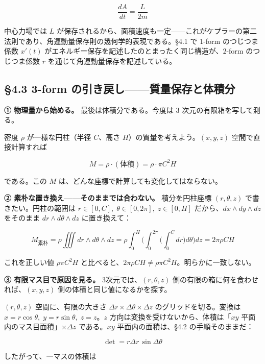 \documentclass[a4paper,12pt,openany]{book}
\begin{document}
\[\frac{dA}{dt} = \frac{L}{2m}\]

中心力場では \(L\)
が保存されるから、面積速度も一定——これがケプラーの第二法則であり、角運動量保存則の幾何学的表現である。§4.1
で \(1\)-form のつじつま係数 \(x'(t)\)
がエネルギー保存を記述したのとまったく同じ構造が、\(2\)-form
のつじつま係数 \(r\) を通じて角運動量保存を記述している。

\hypertarget{form-ux306eux5f15ux304dux623bux3057ux8ceaux91cfux4fddux5b58ux3068ux4f53ux7a4dux5206}{%
\subsection{§4.3 3-form
の引き戻し——質量保存と体積分}\label{form-ux306eux5f15ux304dux623bux3057ux8ceaux91cfux4fddux5b58ux3068ux4f53ux7a4dux5206}}

\textbf{① 物理量から始める。} 最後は体積分である。今度は 3
次元の有限箱を写して測る。

密度 \(\rho\) が一様な円柱（半径 \(C\)、高さ
\(H\)）の質量を考えよう。\((x,y,z)\) 空間で直接計算すれば

\[M = \rho \cdot (\text{体積}) = \rho \cdot \pi C^2 H\]

である。この \(M\) は、どんな座標で計算しても変化してはならない。

\textbf{② 素朴な置き換え——そのままでは合わない。} 積分を円柱座標
\((r,\theta,z)\) で書きたい。円柱の範囲は
\(r \in [0, C],\; \theta \in [0, 2\pi],\; z \in [0, H]\)
だから、\(dx \wedge dy \wedge dz\) をそのまま
\(dr \wedge d\theta \wedge dz\) に置き換えて：

\[
M_{\text{素朴}}
=
\rho \iiint dr\wedge d\theta\wedge dz
=
\rho
\int_0^H
\biggl(
  \int_0^{2\pi}
  \biggl(
    \int_0^C dr
  \biggr)
  d\theta
\biggr)
dz
=
2\pi\rho C H
\]

これを正しい値 \(\rho \pi C^2 H\)
と比べると、\(2\pi\rho C H \neq \rho \pi C^2 H\)。明らかに一致しない。

\textbf{③ 有限マス目で原因を見る。} 3次元では、\((r,\theta,z)\)
側の有限の箱に何を食わせれば、\((x,y,z)\)
側の体積と同じ値になるかを探す。

\((r,\theta,z)\) 空間に、有限の大きさ
\(\Delta r \times \Delta\theta \times \Delta z\)
のグリッドを切る。変換は
\(x = r\cos\theta,\; y = r\sin\theta,\; z = z\)。\(z\)
方向は変換を受けないから、体積は「\(xy\)
平面内のマス目面積」\(\times \Delta z\) である。\(xy\)
平面内の面積は、§4.2 の手順そのままだ：

\[\det = r\Delta r\,\sin\Delta\theta\]

したがって、一マスの体積は
\end{document}
